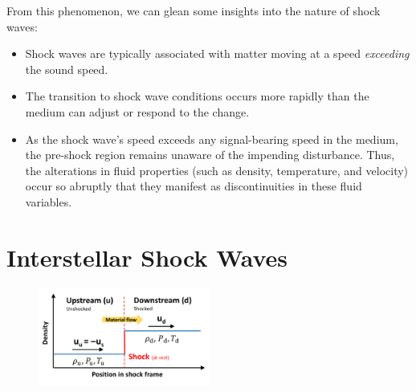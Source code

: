 

From this phenomenon, we can glean some insights into the nature of shock waves:
%
\begin{itemize}
\item Shock waves are typically associated with matter moving at a speed \emph{exceeding} the sound speed.
\item The transition to shock wave conditions occurs more rapidly than the medium can adjust or respond to the change.
\item As the shock wave's speed exceeds any signal-bearing speed in the medium, the pre-shock region remains unaware of the impending disturbance. Thus, the alterations in fluid properties (such as density, temperature, and velocity) occur so abruptly that they manifest as discontinuities in these fluid variables.
\end{itemize}




%

\section{Interstellar Shock Waves}

\begin{figure}[!t]
\centering
\includegraphics[width=0.5\textwidth]{figures/downupstream.pdf}
\caption{}
\end{figure}

